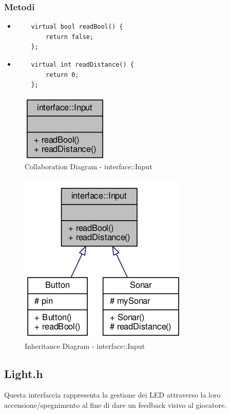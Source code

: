 \subsubsection{Metodi}
\begin{itemize}
	\item 	\begin{verbatim}
	virtual bool readBool() {
	   	return false;
	};
	\end{verbatim}
	\item 	\begin{verbatim}
	virtual int readDistance() {
	   	return 0;
	};
	\end{verbatim}
\end{itemize}
\begin{figure}[!ht]
	\centering
	\includegraphics[scale=.5]{img/UML/CollaborationDiagram/interface/interface::Input.png}
	\caption{Collaboration Diagram - interface::Input}
\end{figure}
\begin{figure}[!ht]
	\centering
	\includegraphics[scale=.5]{img/UML/InheritanceDiagram/interface/interface::Input.png}
	\caption{Inheritance Diagram - interface::Input}
\end{figure}

\newpage
\subsection{Light.h}
Questa interfaccia rappresenta la gestione dei LED attraverso la loro accensione/spegnimento al fine di dare un feedback visivo al giocatore.
